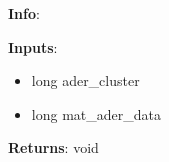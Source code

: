 \textbf{Info}:

\noindent \textbf{Inputs}:
\begin{itemize}
\item{long ader\_cluster}
\item{long mat\_ader\_data}
\end{itemize}

\noindent \textbf{Returns}: void
